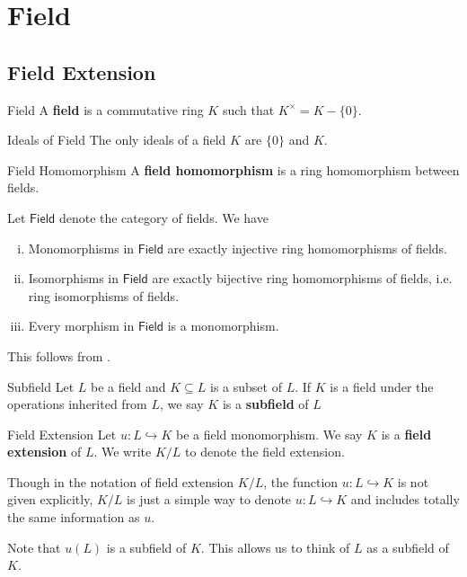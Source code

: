 
\chapter{Field}
\section{Field Extension}
\begin{definition}{Field}{}
    A \textbf{field} is a commutative ring $K$ such that $K^{\times}=K-\{0\}$.
\end{definition}

\begin{proposition}{Ideals of Field}{}
    The only ideals of a field $K$ are $\{0\}$ and $K$.
\end{proposition}



\begin{definition}{Field Homomorphism}{}
    A \textbf{field homomorphism} is a ring homomorphism between fields.
\end{definition}

\begin{proposition}{}{}
    Let $\mathsf{Field}$ denote the category of fields. We have
    \begin{enumerate}[(i)]
        \item Monomorphisms in $\mathsf{Field}$ are exactly injective ring homomorphisms of fields.
        \item Isomorphisms in $\mathsf{Field}$ are exactly bijective ring homomorphisms of fields, i.e. ring isomorphisms of fields.
        \item Every morphism in $\mathsf{Field}$ is a monomorphism.
    \end{enumerate}
\end{proposition}
\begin{prf}
    This follows from .
\end{prf}

\begin{definition}{Subfield}{}
    Let $L$ be a field and $K\subseteq L$ is a subset of $L$. If $K$ is a field under the operations inherited from $L$, we say $K$ is a \textbf{subfield} of $L$
\end{definition}


\begin{definition}{Field Extension}{}
    Let $u:L\hookrightarrow K$ be a field monomorphism. We say $K$ is a \textbf{field extension} of $L$. We write $K/L$ to denote the field extension.
\end{definition}
\begin{remark}
    Though in the notation of field extension $K/L$, the function $u:L\hookrightarrow K$ is not given explicitly, $K/L$ is just a simple way to denote $u:L\hookrightarrow K$ and includes totally the same information as $u$. 
    
    Note that $u(L)$ is a subfield of $K$. This allows us to think of $L$ as a subfield of $K$.
\end{remark}


